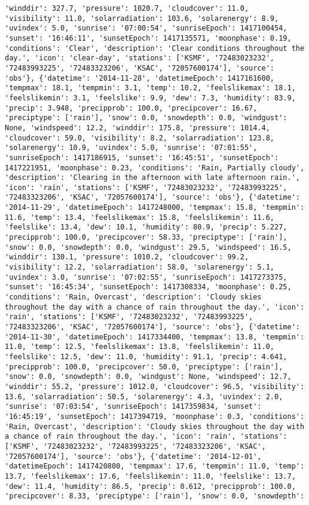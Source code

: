 \documentclass[
  letterpaper,
  DIV=11,
  numbers=noendperiod]{scrartcl}
\begin{document}
\begin{verbatim}
'winddir': 327.7, 'pressure': 1020.7, 'cloudcover': 11.0, 'visibility': 11.0, 'solarradiation': 103.6, 'solarenergy': 8.9, 'uvindex': 5.0, 'sunrise': '07:00:54', 'sunriseEpoch': 1417100454, 'sunset': '16:46:11', 'sunsetEpoch': 1417135571, 'moonphase': 0.19, 'conditions': 'Clear', 'description': 'Clear conditions throughout the day.', 'icon': 'clear-day', 'stations': ['KSMF', '72483023232', '72483993225', '72483323206', 'KSAC', '72057600174'], 'source': 'obs'}, {'datetime': '2014-11-28', 'datetimeEpoch': 1417161600, 'tempmax': 18.1, 'tempmin': 3.1, 'temp': 10.2, 'feelslikemax': 18.1, 'feelslikemin': 3.1, 'feelslike': 9.9, 'dew': 7.3, 'humidity': 83.9, 'precip': 3.948, 'precipprob': 100.0, 'precipcover': 16.67, 'preciptype': ['rain'], 'snow': 0.0, 'snowdepth': 0.0, 'windgust': None, 'windspeed': 12.2, 'winddir': 175.8, 'pressure': 1014.4, 'cloudcover': 59.0, 'visibility': 8.2, 'solarradiation': 123.8, 'solarenergy': 10.9, 'uvindex': 5.0, 'sunrise': '07:01:55', 'sunriseEpoch': 1417186915, 'sunset': '16:45:51', 'sunsetEpoch': 1417221951, 'moonphase': 0.23, 'conditions': 'Rain, Partially cloudy', 'description': 'Clearing in the afternoon with late afternoon rain.', 'icon': 'rain', 'stations': ['KSMF', '72483023232', '72483993225', '72483323206', 'KSAC', '72057600174'], 'source': 'obs'}, {'datetime': '2014-11-29', 'datetimeEpoch': 1417248000, 'tempmax': 15.8, 'tempmin': 11.6, 'temp': 13.4, 'feelslikemax': 15.8, 'feelslikemin': 11.6, 'feelslike': 13.4, 'dew': 10.1, 'humidity': 80.9, 'precip': 5.227, 'precipprob': 100.0, 'precipcover': 58.33, 'preciptype': ['rain'], 'snow': 0.0, 'snowdepth': 0.0, 'windgust': 29.5, 'windspeed': 16.5, 'winddir': 130.1, 'pressure': 1010.2, 'cloudcover': 99.2, 'visibility': 12.2, 'solarradiation': 58.0, 'solarenergy': 5.1, 'uvindex': 3.0, 'sunrise': '07:02:55', 'sunriseEpoch': 1417273375, 'sunset': '16:45:34', 'sunsetEpoch': 1417308334, 'moonphase': 0.25, 'conditions': 'Rain, Overcast', 'description': 'Cloudy skies throughout the day with a chance of rain throughout the day.', 'icon': 'rain', 'stations': ['KSMF', '72483023232', '72483993225', '72483323206', 'KSAC', '72057600174'], 'source': 'obs'}, {'datetime': '2014-11-30', 'datetimeEpoch': 1417334400, 'tempmax': 13.8, 'tempmin': 11.0, 'temp': 12.5, 'feelslikemax': 13.8, 'feelslikemin': 11.0, 'feelslike': 12.5, 'dew': 11.0, 'humidity': 91.1, 'precip': 4.641, 'precipprob': 100.0, 'precipcover': 50.0, 'preciptype': ['rain'], 'snow': 0.0, 'snowdepth': 0.0, 'windgust': None, 'windspeed': 12.7, 'winddir': 55.2, 'pressure': 1012.0, 'cloudcover': 96.5, 'visibility': 13.6, 'solarradiation': 50.5, 'solarenergy': 4.3, 'uvindex': 2.0, 'sunrise': '07:03:54', 'sunriseEpoch': 1417359834, 'sunset': '16:45:19', 'sunsetEpoch': 1417394719, 'moonphase': 0.3, 'conditions': 'Rain, Overcast', 'description': 'Cloudy skies throughout the day with a chance of rain throughout the day.', 'icon': 'rain', 'stations': ['KSMF', '72483023232', '72483993225', '72483323206', 'KSAC', '72057600174'], 'source': 'obs'}, {'datetime': '2014-12-01', 'datetimeEpoch': 1417420800, 'tempmax': 17.6, 'tempmin': 11.0, 'temp': 13.7, 'feelslikemax': 17.6, 'feelslikemin': 11.0, 'feelslike': 13.7, 'dew': 11.4, 'humidity': 86.5, 'precip': 0.612, 'precipprob': 100.0, 'precipcover': 8.33, 'preciptype': ['rain'], 'snow': 0.0, 'snowdepth': 
\end{verbatim}
\end{document}
